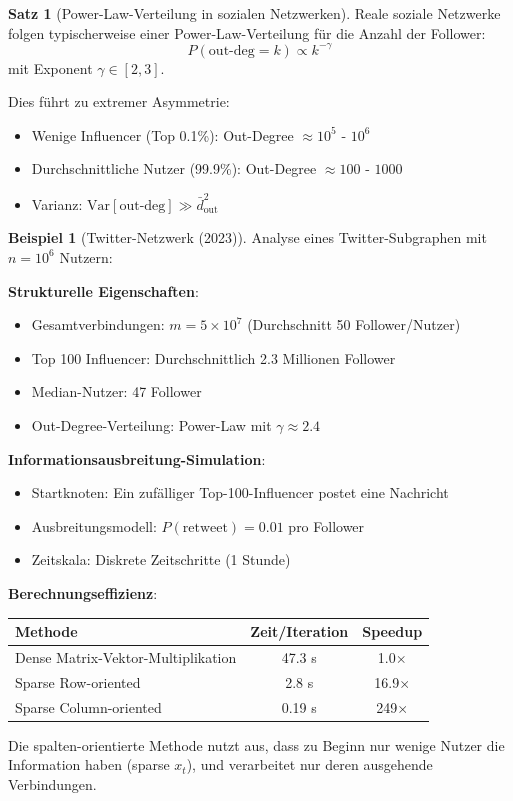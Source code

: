 \documentclass[a4paper,12pt]{report}
\theoremstyle{definition}
\newtheorem{beispiel}{Beispiel}
\newtheorem{satz}{Satz}
\begin{document}
	\begin{satz}[Power-Law-Verteilung in sozialen Netzwerken]
		Reale soziale Netzwerke folgen typischerweise einer Power-Law-Verteilung für die Anzahl der Follower:
		\[
		P(\text{out-deg} = k) \propto k^{-\gamma}
		\]
		mit Exponent $\gamma \in [2, 3]$.
		
		Dies führt zu extremer Asymmetrie:
		\begin{itemize}
			\item Wenige Influencer (Top 0.1\%): Out-Degree $\approx 10^5$ - $10^6$
			\item Durchschnittliche Nutzer (99.9\%): Out-Degree $\approx 100$ - $1000$
			\item Varianz: $\text{Var}[\text{out-deg}] \gg \bar{d}_{\text{out}}^2$
		\end{itemize}
	\end{satz}
	
	\begin{beispiel}[Twitter-Netzwerk (2023)]
		Analyse eines Twitter-Subgraphen mit $n = 10^6$ Nutzern:
		
		\textbf{Strukturelle Eigenschaften}:
		\begin{itemize}
			\item Gesamtverbindungen: $m = 5 \times 10^7$ (Durchschnitt 50 Follower/Nutzer)
			\item Top 100 Influencer: Durchschnittlich 2.3 Millionen Follower
			\item Median-Nutzer: 47 Follower
			\item Out-Degree-Verteilung: Power-Law mit $\gamma \approx 2.4$
		\end{itemize}
		
		\textbf{Informationsausbreitung-Simulation}:
		\begin{itemize}
			\item Startknoten: Ein zufälliger Top-100-Influencer postet eine Nachricht
			\item Ausbreitungsmodell: $P(\text{retweet}) = 0.01$ pro Follower
			\item Zeitskala: Diskrete Zeitschritte (1 Stunde)
		\end{itemize}
		
		\textbf{Berechnungseffizienz}:
		\begin{center}
			\begin{tabular}{|l|c|c|}
				\hline
				\textbf{Methode} & \textbf{Zeit/Iteration} & \textbf{Speedup} \\
				\hline
				Dense Matrix-Vektor-Multiplikation & 47.3 s & 1.0$\times$ \\
				Sparse Row-oriented & 2.8 s & 16.9$\times$ \\
				Sparse Column-oriented & 0.19 s & 249$\times$ \\
				\hline
			\end{tabular}
		\end{center}
		
		Die spalten-orientierte Methode nutzt aus, dass zu Beginn nur wenige Nutzer die Information haben (sparse $x_t$), und verarbeitet nur deren ausgehende Verbindungen.
	\end{beispiel}
	
\end{document}

